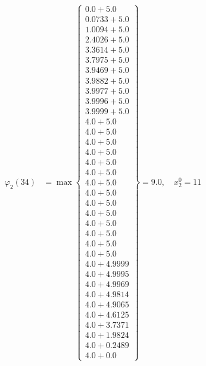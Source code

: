 \documentclass{article}
\begin{document}
\begin{align*}
  
\varphi_{2}(34) &= \max \left\{ \begin{array}{c}
0.0 + 5.0 \\
 0.0733 + 5.0 \\
 1.0094 + 5.0 \\
 2.4026 + 5.0 \\
 3.3614 + 5.0 \\
 3.7975 + 5.0 \\
 3.9469 + 5.0 \\
 3.9882 + 5.0 \\
 3.9977 + 5.0 \\
 3.9996 + 5.0 \\
 3.9999 + 5.0 \\
 4.0 + 5.0 \\
 4.0 + 5.0 \\
 4.0 + 5.0 \\
 4.0 + 5.0 \\
 4.0 + 5.0 \\
 4.0 + 5.0 \\
 4.0 + 5.0 \\
 4.0 + 5.0 \\
 4.0 + 5.0 \\
 4.0 + 5.0 \\
 4.0 + 5.0 \\
 4.0 + 5.0 \\
 4.0 + 5.0 \\
 4.0 + 5.0 \\
 4.0 + 4.9999 \\
 4.0 + 4.9995 \\
 4.0 + 4.9969 \\
 4.0 + 4.9814 \\
 4.0 + 4.9065 \\
 4.0 + 4.6125 \\
 4.0 + 3.7371 \\
 4.0 + 1.9824 \\
 4.0 + 0.2489 \\
 4.0 + 0.0
\end{array} \right\}=9.0,\quad x_{2}^0=11\\
  
  
  

\end{align*}
\end{document}
